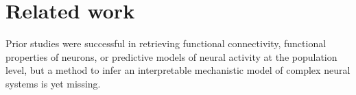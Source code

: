 \documentclass{article}
\begin{document}





\section{Related work}


Prior studies were successful in retrieving functional connectivity, functional properties of neurons, or predictive models of neural activity at the population level, but a method to infer an interpretable mechanistic model of complex neural systems is yet missing.
\end{document}
